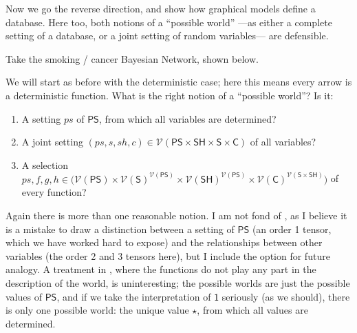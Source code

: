 \documentclass{article}
\newcommand\cmergearr[4]{
		\draw[arr,-] (#1) -- (#4) -- (#2);
		\draw[arr, shorten <=0] (#4) -- (#3);
	}
\newcommand\mergearr[3]{
		\coordinate (center-#1#2#3) at (barycentric cs:#1=1,#2=1,#3=1.2);
		\cmergearr{#1}{#2}{#3}{center-#1#2#3}
	}
\theoremstyle{definition}
\theoremstyle{remark}
\newcommand{\V}{\mathcal V}
\newcommand{\var}[1]{\mathsf{#1}}
\begin{document}
Now we go the reverse direction, and show how graphical models define a database. Here too, both notions of a ``possible world'' ---as either a complete setting of a database, or a joint setting of random variables--- are defensible.
\begin{example}\label{ex:smoking}
    Take the smoking / cancer Bayesian Network, shown below.
    \begin{center}
    \end{center}
    
    We will start as before with the deterministic case; here this means every arrow is a deterministic function. What is the right notion of a ``possible world''? Is it:

    \begin{enumerate}[label=(\arabic*)]
        \item A setting $ps$ of $\var{PS}$, from which all variables are determined? \label{item:initsetting}
        \item A joint setting $(ps, s, sh, c) \in \V(\var{PS \times SH \times S \times C})$ of all variables? \label{item:jointsetting}
        \item A selection $ps,f,g,h \in \Big(\var{\V(PS) \times \V(S)^{\V(PS)}\times \V(SH)^{\V(PS)}\times \V(C)^{\V(S\times SH)}} \Big)$ of every function? \label{item:everyfunction}
    \end{enumerate}
    
    Again there is more than one reasonable notion. I am not fond of , as I believe it is a mistake to draw a distinction between a setting of $\var{PS}$ (an order 1 tensor, which we have worked hard to expose) and the relationships between other variables (the order 2 and 3 tensors here), but I include the option for future analogy. A treatment in , where the functions do not play any part in the description of the world, is uninteresting; the possible worlds are just the possible values of $\var{PS}$, and if we take the interpretation of $\var 1$ seriously (as we should), there is only one possible world: the unique value $\star$, from which all values are determined. 
    

\end{example}
\end{document}
